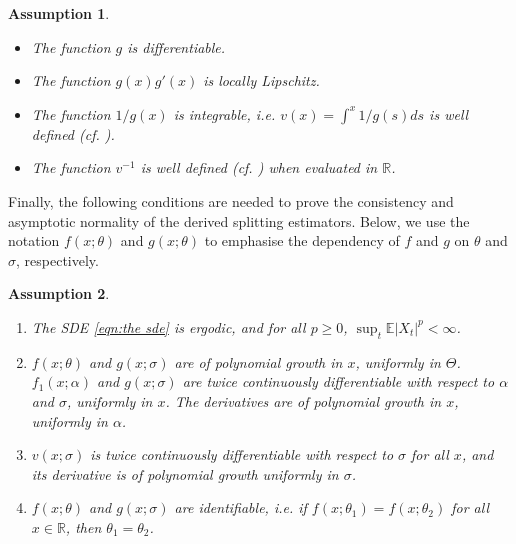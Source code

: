 \documentclass[a4paper,12pt]{article}
\numberwithin{equation}{section}
\theoremstyle{plain}
\newtheorem{assumption}{Assumption}
\theoremstyle{definition}
\begin{document}
\begin{assumption}\label{Assumption2}
\begin{itemize}
\item[(i)] The function $g$ is differentiable.
\item[(ii)] The function $g(x)g'(x)$ is locally Lipschitz.
\item[(iii)] The function $1/g(x)$ is integrable, i.e. $v(x)=\int^x 1/g(s)ds$ is well defined (cf. \cite{kloeden_numerical_1992}).
\item[(iv)] The function $v^{-1}$ is well defined (cf. \cite{kloeden_numerical_1992}) when evaluated in $\mathbb{R}$.
\end{itemize}
\end{assumption}
Finally, the following  conditions are needed to prove the consistency and asymptotic normality of the derived splitting estimators. Below, we use the notation $f(x;\theta)$ and $g(x;\theta)$ to emphasise the dependency of $f$ and $g$ on $\theta$ and $\sigma$, respectively. 
\begin{assumption}\label{Assumption3}
\begin{enumerate}
    \item[(i)] 
The SDE \eqref{eqn:the sde} is ergodic, and for all $p\geq0$, $\sup _t \mathbb{E}\left|X_t\right|^p<\infty$.      \item[(ii)]$f(x;\theta)$ and $g(x;\sigma)$ are of polynomial growth in $x$, uniformly in $\Theta$.  $f_1(x;\alpha)$ and $g(x;\sigma)$ are twice continuously differentiable with respect to $\alpha$ and $\sigma$, uniformly in $x$. The derivatives are of polynomial growth in $x$, uniformly in $\alpha$.
    \item[(iii)] $v(x;\sigma)$ is twice continuously differentiable with respect to $\sigma$ for all $x$, and its derivative is of polynomial growth uniformly in $\sigma$. 
    \item[(iv)] $f(x;\theta)$ and $g(x;\sigma)$ are identifiable, i.e. if $f(x;\theta_1)=f(x;\theta_2)$ for all $x\in \mathbb{R}$, then $\theta_1=\theta_2$.
    \end{enumerate}
\end{assumption}
\end{document}
